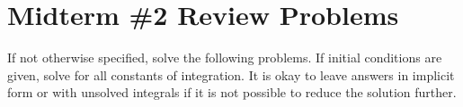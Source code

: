 \documentclass[letterpaper, fontsize=10pt]{scrartcl} %
\numberwithin{equation}{section} %
\numberwithin{figure}{section} %
\numberwithin{table}{section} %
\begin{document}

\newcommand{\horrule}[1]{\rule{\linewidth}{#1}} %


\section*{Midterm \#2 Review Problems}
\par If not otherwise specified, solve the following problems. If initial conditions are given, solve for all constants of integration. It is okay to leave answers in implicit form or with unsolved integrals if it is not possible to reduce the solution further. 
\end{document}
